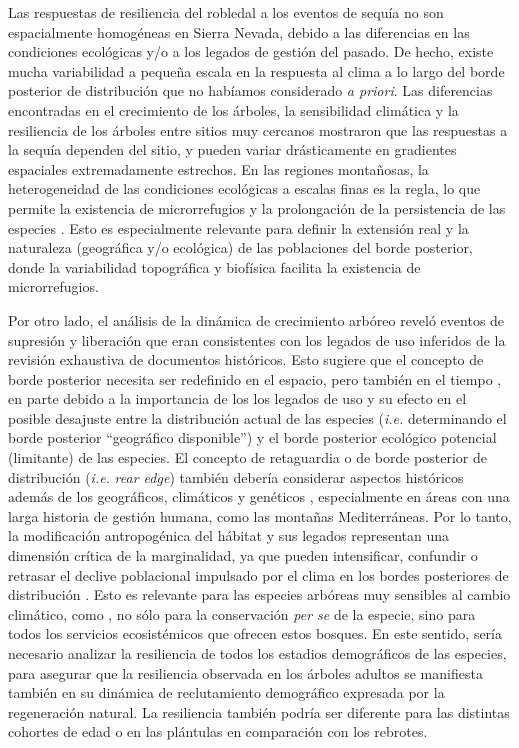 Las respuestas de resiliencia del robledal a los eventos de sequía no son espacialmente homogéneas en Sierra Nevada, debido a las diferencias en las condiciones ecológicas y/o a los legados de gestión del pasado. De hecho, existe mucha variabilidad a pequeña escala en la respuesta al clima a lo largo del borde posterior de distribución que no habíamos considerado \emph{a priori}. Las diferencias encontradas en el crecimiento de los árboles, la sensibilidad climática y la resiliencia de los árboles entre sitios muy cercanos mostraron que las respuestas a la sequía dependen del sitio, y pueden variar drásticamente en gradientes espaciales extremadamente estrechos. En las regiones montañosas, la heterogeneidad de las condiciones ecológicas a escalas finas es la regla, lo que permite la existencia de microrrefugios y la prolongación de la persistencia de las especies \autocite{Olaldeetal2002WhiteOaks,SerraDiazetal2015DisturbanceClimate}. Esto es especialmente relevante para definir la extensión real y la naturaleza (geográfica y/o ecológica) de las poblaciones del borde posterior, donde la variabilidad topográfica y biofísica facilita la existencia de microrrefugios.

Por otro lado, el análisis de la dinámica de crecimiento arbóreo reveló eventos de supresión y liberación que eran consistentes con los legados de uso inferidos de la revisión exhaustiva de documentos históricos. Esto sugiere que el concepto de borde posterior necesita ser redefinido en el espacio, pero también en el tiempo \autocite{VilaCabreraetal2019RefiningPredictions}, en parte debido a la importancia de los los legados de uso y su efecto en el posible desajuste entre la distribución actual de las especies (\emph{i.e.} determinando el borde posterior ``geográfico disponible'') y el borde posterior ecológico potencial (limitante) de las especies. El concepto de retaguardia o de borde posterior de distribución (\emph{i.e.} \emph{rear edge}) también debería considerar aspectos históricos además de los geográficos, climáticos y genéticos \autocite{VilaCabreraetal2019RefiningPredictions}, especialmente en áreas con una larga historia de gestión humana, como las montañas Mediterráneas. Por lo tanto, la modificación antropogénica del hábitat y sus legados representan una dimensión crítica de la marginalidad, ya que pueden intensificar, confundir o retrasar el declive poblacional impulsado por el clima en los bordes posteriores de distribución \autocite{VilaCabreraetal2019RefiningPredictions}. Esto es relevante para las especies arbóreas muy sensibles al cambio climático, como \Qpy, no sólo para la conservación \emph{per se} de la especie, sino para todos los servicios ecosistémicos que ofrecen estos bosques. En este sentido, sería necesario analizar la resiliencia de todos los estadios demográficos de las especies, para asegurar que la resiliencia observada en los árboles adultos se manifiesta también en su dinámica de reclutamiento demográfico expresada por la regeneración natural. La resiliencia también podría ser diferente para las distintas cohortes de edad o en las plántulas en comparación con los rebrotes.

